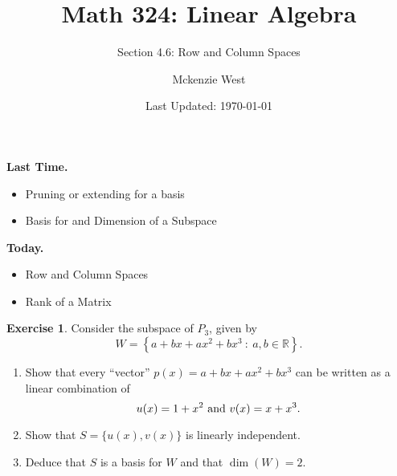 \documentclass{beamer}
\newcommand{\R}{\mathbb{R}}
\newcommand{\fn}{\insertframenumber}
\theoremstyle{definition}
\newtheorem{exercise}{Exercise}
\begin{document}
	\title{Math 324: Linear Algebra}
	\subtitle{Section 4.6: Row and Column Spaces}
	\author{Mckenzie West}
	\date{Last Updated: \today}
\begin{frame}
\maketitle
\end{frame}

\begin{frame}{\insertframenumber}
	\begin{block}{\textbf{Last Time.}}
	\begin{itemize}[label=--]
		\item Pruning or extending for a basis
		\item Basis for and Dimension of a Subspace
	\end{itemize}
	\end{block}
	\begin{block}{\textbf{Today.}}
		\begin{itemize}[label=--]
			\item Row and Column Spaces
			\item Rank of a Matrix
		\end{itemize}
	\end{block}
\end{frame}
\begin{frame}{\fn}
	\begin{exercise}
		Consider the subspace of $P_3$, given by
			\[W=\left\{a+bx+ax^2+bx^3\ :\ a,b\in\R\right\}.\]
		\begin{enumerate}[label=(\alph*)]
			\item Show that every ``vector'' $p(x)=a+bx+ax^2+bx^3$ can be written as a linear combination of
				\[u(x)=1+x^2\textup{ and }
				v(x)=x+x^3.\]
			\item Show that $S=\{u(x),v(x)\}$ is linearly independent.
			\item Deduce that $S$ is a basis for $W$ and that $\dim(W)=2$.
		\end{enumerate}
	\end{exercise}
\end{frame}
\end{document}
